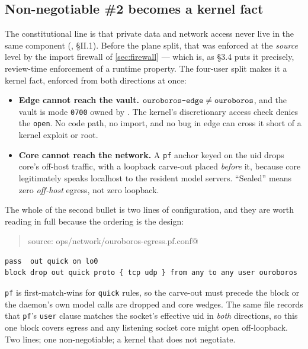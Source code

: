 \subsection*{Non-negotiable \#2 becomes a kernel fact}

The constitutional line is that private data and network access never live in the
same component (, \S II.1). Before the plane
split, that was enforced at the \emph{source} level by the import firewall of
\autoref{sec:firewall} --- which is, as  \S 3.4 puts
it precisely, review-time enforcement of a runtime property. The four-user split
makes it a kernel fact, enforced from both directions at once:

\begin{itemize}[leftmargin=*]
  \item \textbf{Edge cannot reach the vault.} $\texttt{ouroboros-edge}{} \neq \texttt{ouroboros}{}$, and the
    vault is mode \texttt{0700} owned by \pcore{}. The kernel's discretionary
    access check denies the \texttt{open}. No code path, no import, and no bug in
    edge can cross it short of a kernel exploit or root.
  \item \textbf{Core cannot reach the network.} A \texttt{pf} anchor keyed on the
    uid drops core's off-host traffic, with a loopback carve-out placed
    \emph{before} it, because core legitimately speaks localhost to the resident
    model servers. ``Sealed'' means zero \emph{off-host} egress, not zero loopback.
\end{itemize}

The whole of the second bullet is two lines of configuration, and they are worth
reading in full because the ordering is the design:

\begin{quote}\small\ttfamily
source: ops/network/ouroboros-egress.pf.conf@\gitref
\end{quote}
{\small\begin{verbatim}
pass  out quick on lo0
block drop out quick proto { tcp udp } from any to any user ouroboros
\end{verbatim}}

\noindent \texttt{pf} is first-match-wins for \texttt{quick} rules, so the carve-out
must precede the block or the daemon's own model calls are dropped and core wedges.
The same file records that \texttt{pf}'s \texttt{user} clause matches the socket's
effective uid in \emph{both} directions, so this one block covers egress and any
listening socket core might open off-loopback. Two lines; one non-negotiable; a
kernel that does not negotiate.

